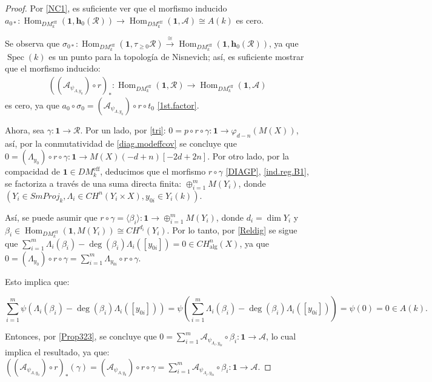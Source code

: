 \documentclass[10pt]{amsart}
\theoremstyle{definition}
\theoremstyle{remark}
\theoremstyle{definition}
\begin{document}
\begin{proof}
Por \ref{NC1}, es suficiente ver que el morfismo inducido
$a_{0 \ast}:
\operatorname{Hom}_{DM^{\mathrm{eff}}_{k}}(\mathbf{1}, \mathbf{h}_0(\mathcal{R})) \rightarrow
\operatorname{Hom}_{DM^{\mathrm{eff}}_{k}}(\mathbf{1}, \mathcal{A})\cong A(k)$ es cero.

Se observa que 
$\sigma_{0\ast}:
\operatorname{Hom}_{DM^{\mathrm{eff}}_{k}}(\mathbf{1}, \tau_{\geq 0} \mathcal{R}) 
\stackrel{\cong}{\rightarrow}
\operatorname{Hom}_{DM^{\mathrm{eff}}_{k}}(\mathbf{1}, \mathbf{h}_0(\mathcal{R}))$, ya que $\operatorname{Spec}(k)$
es un punto para la topología de Nisnevich; así, es
suficiente mostrar que el morfismo inducido:
\begin{align*}
((\mathcal{A}_{\psi_{\Lambda, y_0}})\circ r)_\ast:
\operatorname{Hom}_{DM^{\mathrm{eff}}_{k}}(\mathbf{1}, \mathcal{R}) \rightarrow
\operatorname{Hom}_{DM^{\mathrm{eff}}_{k}}(\mathbf{1}, \mathcal{A})
\end{align*}
es cero, ya que
$a_0\circ \sigma_0 = (\mathcal{A}_{\psi_{\Lambda, y_0}})\circ r \circ t_0$ \eqref{1st.factor}.

Ahora, sea $\gamma:\mathbf{1}\to\mathcal{R}$. Por un lado, por \ref{tri}: $0=p\circ r\circ\gamma:\mathbf{1}\to\varphi_{d-n}(M(X))$, así, por la conmutatividad de \ref{diag.modeffcov} se concluye que $0=(\Lambda_{y_{0}})\circ r\circ\gamma:\mathbf{1}\to M(X)(-d+n)[-2d+2n]$. Por otro lado, por la compacidad de $\mathbf{1}\in DM^{\mathrm{eff}}_{k}$, deducimos que el morfismo $r\circ\gamma$ \ref{DIAGP}, \ref{ind.reg.B1}, se factoriza a través de una suma directa finita: $\oplus_{i=1}^{m}M(Y_{i})$, donde $(Y_{i}\in SmProj_{k},\Lambda_{i}\in CH^{n}(Y_{i}\times X),y_{0i}\in Y_{i}(k))$.

Así, se puede asumir que $r\circ\gamma=\langle\beta_{i}\rangle:\mathbf{1}\to\oplus_{i=1}^{m}M(Y_{i})$, donde $d_{i}=\dim Y_{i}$ y $\beta_{i}\in\operatorname{Hom}_{DM^{\mathrm{eff}}_{k}}(\mathbf{1},M(Y_{i}))\cong CH^{d_{i}}(Y_{i})$. Por lo tanto, por \ref{Reldig} se sigue que $\sum_{i=1}^{m}\Lambda_{i}(\beta_{i})-\deg(\beta_{i})\Lambda_{i}([y_{0i}])=0\in CH ^{n}_{\mathrm{alg}}(X)$, ya que $0=(\Lambda_{y_{0}})\circ r\circ\gamma=\sum_{i=1}^{m}\Lambda_{y_{0i}}\circ r\circ\gamma$.

Esto implica que:

\[
\sum_{i=1}^{m}\psi(\Lambda_{i}(\beta_{i})-\deg(\beta_{i})\Lambda_{i}([y_{0i}])) =\psi\left(\sum_{i=1}^{m}\Lambda_{i}(\beta_{i})-\deg(\beta_{i}) \Lambda_{i}([y_{0i}])\right)
=\psi(0)=0\in A(k).
\]

Entonces, por \ref{Prop323}, se concluye que $0=\sum_{i=1}^{m}\mathcal{A}_{\psi_{\Lambda_{i},y_{0i}}}\circ\beta_{i}:\mathbf{1}\to\mathcal{A}$, lo cual implica el resultado, ya que: $((\mathcal{A}_{\psi_{\Lambda,y_{0}}})\circ r)_{*}(\gamma)=(\mathcal{A}_{\psi_{\Lambda,y_{0}}})\circ r\circ\gamma=\sum_{i=1}^{m}\mathcal{A}_{\psi_{\Lambda_{i },y_{0i}}}\circ\beta_{i}:\mathbf{1}\to\mathcal{A}$.
\end{proof}
\end{document}
